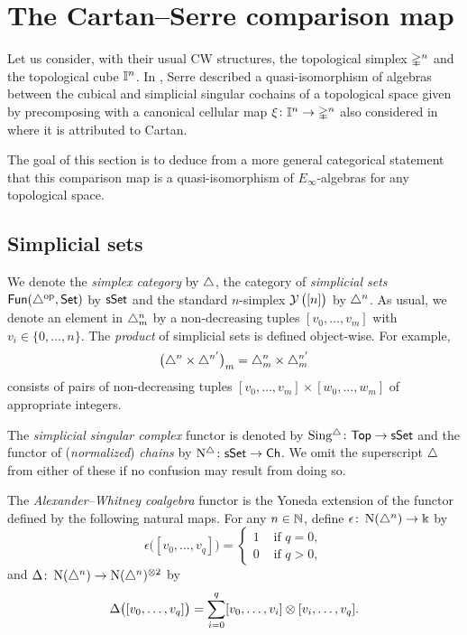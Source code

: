 
\section{The Cartan--Serre comparison map} \label{s:the cartan-serre comparison map}

Let us consider, with their usual CW structures, the topological simplex $\mathbb{\Delta}^n$ and the topological cube $\mathbb{I}^n$.
In \cite[p. 442]{serre1951homologie}, Serre described a quasi-isomorphism of algebras between the cubical and simplicial singular cochains of a topological space given by precomposing with a canonical cellular map $\operatorname{\xi} \colon \mathbb{I}^n \to \mathbb{\Delta}^n$ also considered in \cite[p.199]{eilenberg1953acyclic} where it is attributed to Cartan.

The goal of this section is to deduce from a more general categorical statement that this comparison map is a quasi-isomorphism of $E_\infty$-algebras for any topological space.

\subsection{Simplicial sets} \label{ss:simplicial sets}

We denote the \textit{simplex category} by $\triangle$, the category of \textit{simplicial sets} $\mathsf{Fun}(\triangle^{\mathrm{op}}, \mathsf{Set})$ by $\mathsf{sSet}$ and the standard $n$-simplex $\operatorname{\mathcal{Y}}\big( [n] \big)$ by $\triangle^n$.
As usual, we denote an element in $\triangle^n_m$ by a non-decreasing tuples $[v_0, \dots, v_m]$ with $v_i \in \{0, \dots, n\}$.
The \textit{product} of simplicial sets is defined object-wise.
For example,
\[
\big(\triangle^n \times \triangle^{n'}\big)_m = \triangle^n_m \times \triangle^{n'}_m
\]
consists of pairs of non-decreasing tuples $[v_0, \dots, v_m] \times [w_0, \dots, w_m]$ of appropriate integers.

The \textit{simplicial singular complex} functor is denoted by $\operatorname{Sing^{\triangle}} \colon \mathsf{Top} \to \mathsf{sSet}$ and the functor of (\textit{normalized}) \textit{chains} by $\operatorname{N^{\triangle}} \colon \mathsf{sSet} \to \mathsf{Ch}$.
We omit the superscript $\triangle$ from either of these if no confusion may result from doing so.

The \textit{Alexander--Whitney coalgebra} functor is the Yoneda extension of the functor defined by the following natural maps.
For any $n \in \mathbb{N}$, define $\epsilon \colon \operatorname{N}(\triangle^n) \to \Bbbk$ by
\[
\epsilon \big( [v_0, \dots, v_q] \big) = \begin{cases} 1 & \text{ if } q = 0, \\ 0 & \text{ if } q>0, \end{cases}
\]
and $\Delta \colon \operatorname{N}(\triangle^n) \to \operatorname{N}(\triangle^n)^{\otimes 2}$ by
\[
\Delta \big( [v_0, \dots, v_q] \big) = \sum_{i=0}^q [v_0, \dots, v_i] \otimes [v_i, \dots, v_q].
\]

